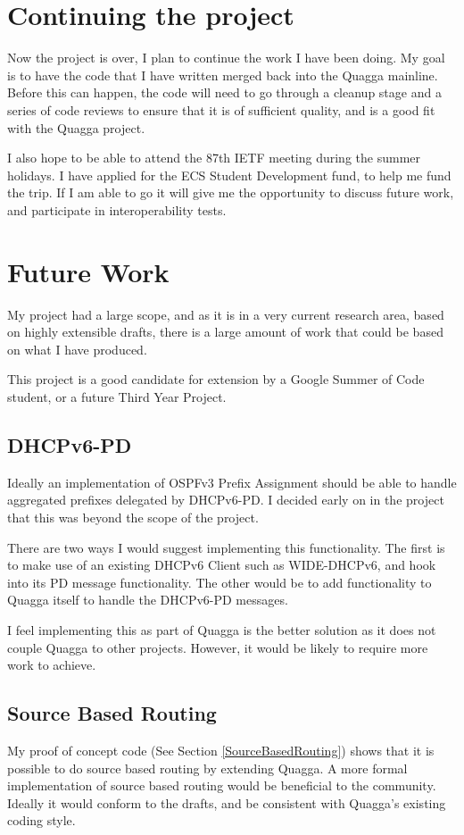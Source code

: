\documentclass[12pt,a4paper,twoside]{report}
\begin{document}
\section{Continuing the project}
Now the project is over, I plan to continue the work I have been doing.  My
goal is to have the code that I have written merged back into the Quagga
mainline. Before this can happen, the code will need to go through a cleanup
stage and a series of code reviews to ensure that it is of sufficient quality,
and is a good fit with the Quagga project.

I also hope to be able to attend the 87th IETF meeting during the summer
holidays. I have applied for the ECS Student Development fund, to help me fund
the trip. If I am able to go it will give me the opportunity to discuss future
work, and participate in interoperability tests.

\section{Future Work}
My project had a large scope, and as it is in a very current research area,
based on highly extensible drafts, there is a large amount of work that could
be based on what I have produced. 

This project is a good candidate for extension by a Google Summer of Code
student, or a future Third Year Project. 

\subsection{DHCPv6-PD}
Ideally an implementation of OSPFv3 Prefix Assignment should be able to handle
aggregated prefixes delegated by DHCPv6-PD\@. I decided early on in the project
that this was beyond the scope of the project. 

There are two ways I would suggest implementing this functionality. The first
is to make use of an existing DHCPv6 Client such as WIDE-DHCPv6, and hook into
its PD message functionality. The other would be to add functionality to Quagga
itself to handle the DHCPv6-PD messages. 

I feel implementing this as part of Quagga is the better solution as it does
not couple Quagga to other projects. However, it would be likely to require
more work to achieve.

\subsection{Source Based Routing} 
My proof of concept code (See Section \ref{SourceBasedRouting}) shows that it
is possible to do source based routing by extending Quagga. A more formal
implementation of source based routing would be beneficial to the community.
Ideally it would conform to the drafts, and be consistent with Quagga's
existing coding style. 
\end{document}

